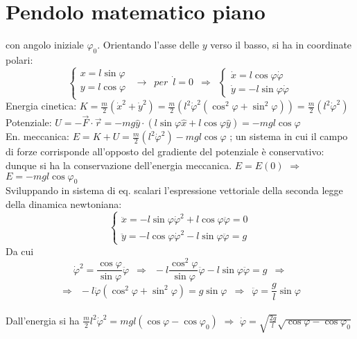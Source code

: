 \documentclass[10pt, oneside]{book}
\theoremstyle{plain}
\begin{document}
\section{Pendolo matematico piano}
con angolo iniziale $\varphi_0$. Orientando l'asse delle $y$ verso il basso, si ha in coordinate polari:
\[\begin{cases}
	x = l \sin \varphi \\
	y = l \cos \varphi \\
\end{cases} \enspace \rightarrow \enspace per \enspace \dot l = 0 \enspace \Rightarrow \enspace \begin{cases}
    \dot x = l \cos \varphi \dot \varphi \\
    \dot y = - l \sin \varphi \dot \varphi
\end{cases}\]
Energia cinetica: $\displaystyle K = \frac{m}{2}(\dot x^2 + \dot y^2) = \frac{m}{2}(l^2 \dot \varphi^2 (\cos^2 \varphi + \sin^2 \varphi)) = \frac{m}{2}(l^2 \dot \varphi^2)$
\\Potenziale: $\displaystyle U = - \Vec{F} \cdot \Vec{r} = - mg \hat{y} \cdot (l \sin \varphi \hat{x} + l \cos \varphi \hat{y}) = - mg l \cos \varphi$
\\En. meccanica: $\displaystyle E = K + U = \frac{m}{2}(l^2 \dot \varphi^2) - mg l \cos \varphi$ ; un sistema in cui il campo di forze corrisponde all'opposto del gradiente del potenziale è conservativo: dunque si ha la conservazione dell'energia meccanica. $E = E(0)$ $\Rightarrow$ $\displaystyle E = - mg l \cos \varphi_0$
\\Sviluppando in sistema di eq. scalari l'espressione vettoriale della seconda legge della dinamica newtoniana:
\[\begin{cases}
    \ddot x = - l \sin \varphi \dot \varphi^2 + l \cos \varphi \ddot \varphi = 0\\
    \ddot y = - l \cos \varphi \dot \varphi^2 - l \sin \varphi \ddot \varphi = g
\end{cases}\]
Da cui
\[\dot \varphi^2 = \frac{\cos \varphi}{\sin \varphi}\ddot \varphi \enspace \Rightarrow \enspace - l \frac{\cos^2 \varphi}{\sin \varphi} \ddot \varphi - l \sin \varphi \ddot \varphi = g \enspace \Rightarrow\]
\[\Rightarrow \enspace - l \ddot \varphi (\cos^2 \varphi + \sin^2 \varphi) = g \sin\varphi \enspace \Rightarrow \enspace \ddot \varphi = \frac{g}{l}\sin \varphi\]
\\Dall'energia si ha $\displaystyle \frac{m}{2}l^{2} \dot \varphi^2 = m g l (\cos \varphi - \cos \varphi_0)$ $\Rightarrow$ $\displaystyle \dot \varphi = \sqrt{\frac{2g}{l}}\sqrt{\cos \varphi - \cos \varphi_0}$
\end{document}

